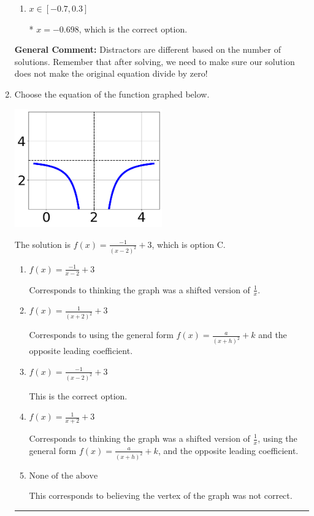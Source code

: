 \documentclass{extbook}[14pt]
\newcommand{\litem}[1]{\item #1

\rule{\textwidth}{0.4pt}}
\begin{document}
\begin{enumerate}
{\begin{enumerate}[label=\Alph*.]
$x = 0.969$, which corresponds to not distributing the factor $-6x -5$ correctly when trying to eliminate the fraction.
\item \( x \in [-0.7,0.3] \)

* $x = -0.698$, which is the correct option.
\end{enumerate}

\textbf{General Comment:} Distractors are different based on the number of solutions. Remember that after solving, we need to make sure our solution does not make the original equation divide by zero!
}
\litem{
Choose the equation of the function graphed below.

\begin{center}
    \includegraphics[width=0.5\textwidth]{../Figures/rationalGraphToEquationB.png}
\end{center}


The solution is \( f(x) = \frac{-1}{(x - 2)^2} + 3 \), which is option C.\begin{enumerate}[label=\Alph*.]
\item \( f(x) = \frac{-1}{x - 2} + 3 \)

Corresponds to thinking the graph was a shifted version of $\frac{1}{x}$.
\item \( f(x) = \frac{1}{(x + 2)^2} + 3 \)

Corresponds to using the general form $f(x) = \frac{a}{(x+h)^2}+k$ and the opposite leading coefficient.
\item \( f(x) = \frac{-1}{(x - 2)^2} + 3 \)

This is the correct option.
\item \( f(x) = \frac{1}{x + 2} + 3 \)

Corresponds to thinking the graph was a shifted version of $\frac{1}{x}$, using the general form $f(x) = \frac{a}{(x+h)^2}+k$, and the opposite leading coefficient.
\item \( \text{None of the above} \)

This corresponds to believing the vertex of the graph was not correct.
\end{enumerate}

}
\end{enumerate}
\end{document}
